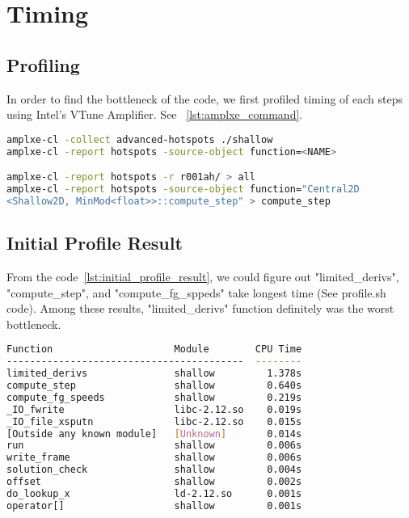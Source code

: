 \section{Timing}
\subsection{Profiling}
In order to find the bottleneck of the code, we first profiled
 timing of each steps using Intel’s VTune Amplifier. See ~\ref{lst:amplxe_command}.
 
\begin{lstlisting}[caption={VTune Amplifier Command},label={lst:amplxe_command},frame=single,language=bash]
amplxe-cl -collect advanced-hotspots ./shallow
amplxe-cl -report hotspots -source-object function=<NAME>

amplxe-cl -report hotspots -r r001ah/ > all
amplxe-cl -report hotspots -source-object function="Central2D
<Shallow2D, MinMod<float>>::compute_step" > compute_step
\end{lstlisting}

\subsection{Initial Profile Result}

From the code~\ref{lst:initial_profile_result}, we could figure out "limited\_derivs", "compute\_step", and "compute\_fg\_sppeds" take longest time (See profile.sh code). Among these results, "limited\_derivs" function definitely was the worst bottleneck. 

\begin{lstlisting}[caption={Initial Profile Result},label={lst:initial_profile_result},frame=single,language=bash]
Function                     Module        CPU Time
-----------------------------------------  --------
limited_derivs               shallow         1.378s
compute_step                 shallow         0.640s
compute_fg_speeds            shallow         0.219s
_IO_fwrite                   libc-2.12.so    0.019s
_IO_file_xsputn              libc-2.12.so    0.015s
[Outside any known module]   [Unknown]       0.014s
run                          shallow         0.006s
write_frame                  shallow         0.006s
solution_check               shallow         0.004s
offset                       shallow         0.002s
do_lookup_x                  ld-2.12.so      0.001s
operator[]                   shallow         0.001s
\end{lstlisting}


